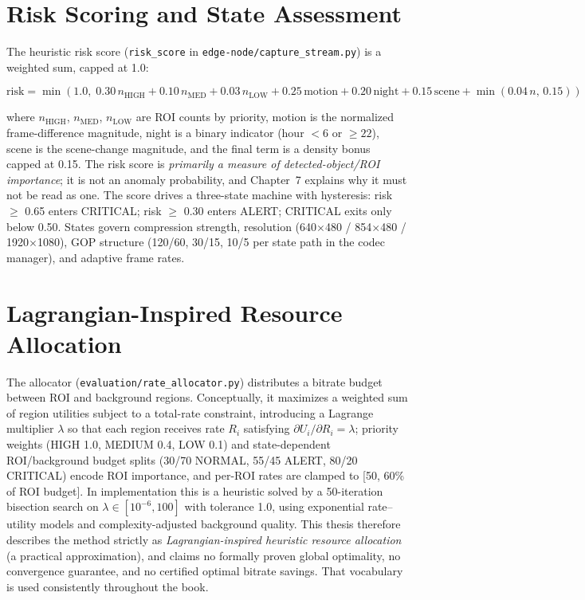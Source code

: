 \section{Risk Scoring and State Assessment}

The heuristic risk score (\texttt{risk\_score} in \texttt{edge-node/capture\_stream.py}) is a weighted sum, capped at 1.0:

\begin{equation}
\mathrm{risk} = \min(1.0,\; 0.30\,n_{\mathrm{HIGH}} + 0.10\,n_{\mathrm{MED}} + 0.03\,n_{\mathrm{LOW}} + 0.25\,\mathrm{motion} + 0.20\,\mathrm{night} + 0.15\,\mathrm{scene} + \min(0.04\,n,\,0.15))
\label{eq:risk}
\end{equation}

where $n_{\mathrm{HIGH}}$, $n_{\mathrm{MED}}$, $n_{\mathrm{LOW}}$ are ROI counts by priority, motion is the normalized frame-difference magnitude, night is a binary indicator (hour $<6$ or $\geq 22$), scene is the scene-change magnitude, and the final term is a density bonus capped at 0.15. The risk score is \textit{primarily a measure of detected-object/ROI importance}; it is not an anomaly probability, and Chapter~7 explains why it must not be read as one. The score drives a three-state machine with hysteresis: risk $\geq$ 0.65 enters CRITICAL; risk $\geq$ 0.30 enters ALERT; CRITICAL exits only below 0.50. States govern compression strength, resolution (640$\times$480 / 854$\times$480 / 1920$\times$1080), GOP structure (120/60, 30/15, 10/5 per state path in the codec manager), and adaptive frame rates.

\section{Lagrangian-Inspired Resource Allocation}

The allocator (\texttt{evaluation/rate\_allocator.py}) distributes a bitrate budget between ROI and background regions. Conceptually, it maximizes a weighted sum of region utilities subject to a total-rate constraint, introducing a Lagrange multiplier $\lambda$ so that each region receives rate $R_i$ satisfying $\partial U_i / \partial R_i = \lambda$; priority weights (HIGH 1.0, MEDIUM 0.4, LOW 0.1) and state-dependent ROI/background budget splits (30/70 NORMAL, 55/45 ALERT, 80/20 CRITICAL) encode ROI importance, and per-ROI rates are clamped to [50, 60\% of ROI budget]. In implementation this is a heuristic solved by a 50-iteration bisection search on $\lambda \in [10^{-6}, 100]$ with tolerance 1.0, using exponential rate--utility models and complexity-adjusted background quality. This thesis therefore describes the method strictly as \textit{Lagrangian-inspired heuristic resource allocation} (a practical approximation), and claims no formally proven global optimality, no convergence guarantee, and no certified optimal bitrate savings. That vocabulary is used consistently throughout the book.

